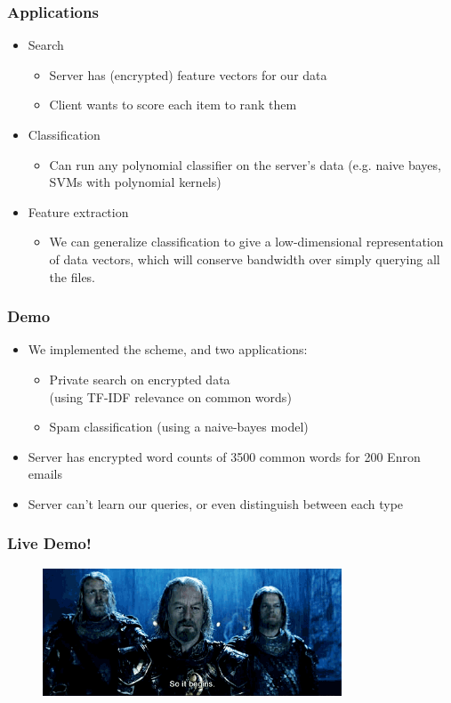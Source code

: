 \documentclass{beamer}
\newcommand{\itz}[1]{\begin{itemize}#1\end{itemize}} %
\begin{document}
\begin{frame}
\frametitle{Applications}

\itz{
\item{Search
 \itz{
 	\item{Server has (encrypted) feature vectors for our data}
 	\item{Client wants to score each item to rank them}
	}
 }
\vspace{.1in}
\item{Classification
	\itz {
		\item{Can run any polynomial classifier on the server's data (e.g. naive bayes, SVMs with polynomial kernels)}
	}
}
\vspace{.1in}
\item{Feature extraction
	\itz {
		\item{We can generalize classification to give a low-dimensional representation of data vectors, which will conserve bandwidth over simply querying all the files.}
	}
}
}
\end{frame}







\begin{frame}
\frametitle{Demo}
\itz{
\item{We implemented the scheme, and two applications:}
\vspace{.05in}
\itz{
	\item{Private search on encrypted data \\(using TF-IDF relevance on common words)}
	
\vspace{.05in}
	\item{Spam classification (using a naive-bayes model)}
}
\vspace{.1in}
\item{Server has encrypted word counts of 3500 common words for 200 Enron emails}
\vspace{.1in}
\item{Server can't learn our queries, or even distinguish between each type}
}
\end{frame}


\begin{frame}
\frametitle{Live Demo!}
\begin{figure}[ht]
\centering
\includegraphics[width=3.5in]{live}
\end{figure}
\end{frame}
\end{document}
